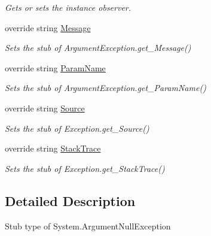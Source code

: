 \begin{DoxyCompactItemize}
\begin{DoxyCompactList}\small\item\em Gets or sets the instance observer.\end{DoxyCompactList}\item 
override string \hyperlink{class_system_1_1_fakes_1_1_stub_argument_null_exception_a7b7eed979d68ddf2c2154e118c3b4764}{Message}
\begin{DoxyCompactList}\small\item\em Sets the stub of Argument\-Exception.\-get\-\_\-\-Message()\end{DoxyCompactList}\item 
override string \hyperlink{class_system_1_1_fakes_1_1_stub_argument_null_exception_abd410d5f4f677608948f6edf5ab01f5c}{Param\-Name}
\begin{DoxyCompactList}\small\item\em Sets the stub of Argument\-Exception.\-get\-\_\-\-Param\-Name()\end{DoxyCompactList}\item 
override string \hyperlink{class_system_1_1_fakes_1_1_stub_argument_null_exception_ae8698aa05d3786f41afd6a37cd59e23b}{Source}
\begin{DoxyCompactList}\small\item\em Sets the stub of Exception.\-get\-\_\-\-Source()\end{DoxyCompactList}\item 
override string \hyperlink{class_system_1_1_fakes_1_1_stub_argument_null_exception_a79993cd3cba37e4dd5246e6337bf2e40}{Stack\-Trace}
\begin{DoxyCompactList}\small\item\em Sets the stub of Exception.\-get\-\_\-\-Stack\-Trace()\end{DoxyCompactList}\end{DoxyCompactItemize}


\subsection{Detailed Description}
Stub type of System.\-Argument\-Null\-Exception



